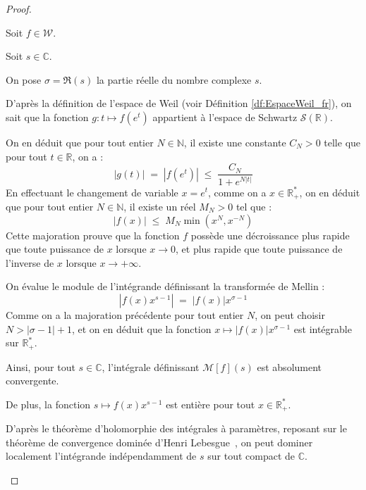 \documentclass[Riemann_Hypothesis.tex]{subfiles}
\begin{document}
\begin{proof}
    \begin{part_proof}
        Soit $f \in \mathcal{W}$. \par
        Soit $s \in \mathbb{C}$. \par
        On pose $\sigma = \Re(s)$ la partie réelle du nombre complexe $s$. \par
        D'après la définition de l'espace de Weil (voir Définition \ref{df:EspaceWeil_fr}), 
        on sait que la fonction $g : t \mapsto f(e^t)$ appartient à l'espace de Schwartz 
        $\mathcal{S}(\mathbb{R})$. \par
        On en déduit que pour tout entier $N \in \mathbb{N}$, il existe une constante 
        $C_N > 0$ telle que pour tout $t \in \mathbb{R}$, on a :
        \begin{equation*}
            |g(t)| \;=\; |f(e^t)| \;\leq\; \frac{C_N}{1 + e^{N|t|}}
        \end{equation*}
        En effectuant le changement de variable $x = e^t$, comme on a $x \in \mathbb{R}_+^*$, 
        on en déduit que pour tout entier $N \in \mathbb{N}$, il existe un réel $M_N > 0$ 
        tel que :
        \begin{equation*}
            |f(x)| \;\leq\; M_N \min\left(x^N, x^{-N}\right)
        \end{equation*}
        Cette majoration prouve que la fonction $f$ possède une décroissance plus rapide que 
        toute puissance de $x$ lorsque $x \to 0$, et plus rapide que toute puissance de 
        l'inverse de $x$ lorsque $x \to +\infty$. \par
        On évalue le module de l'intégrande définissant la transformée de Mellin :
        \begin{equation*}
            \left| f(x) x^{s-1} \right| \;=\; |f(x)| x^{\sigma-1}
        \end{equation*}
        Comme on a la majoration précédente pour tout entier $N$, on peut choisir
        $N > |\sigma - 1| + 1$, et on en déduit que la fonction
        $x \mapsto |f(x)| x^{\sigma-1}$ est intégrable sur $\mathbb{R}_+^*$. \medskip\par

        Ainsi, pour tout $s \in \mathbb{C}$, l'intégrale définissant
        $\mathcal{M}[f](s)$ est absolument convergente. \par
        De plus, la fonction $s \mapsto f(x) x^{s-1}$ est entière
        pour tout $x \in \mathbb{R}_+^*$. \par
        D'après le théorème d'holomorphie des intégrales à paramètres,
        reposant sur le théorème de convergence dominée d'Henri 
        Lebesgue~\cite{lebesgue1902_these}, on peut dominer localement l'intégrande
        indépendamment de $s$ sur tout compact de $\mathbb{C}$.
    \end{part_proof}


\end{proof}
\end{document}
